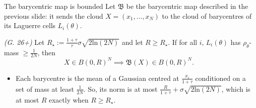 \documentclass[aspectratio=169]{beamer} %
\renewcommand{\ln}[1]{\mathrm{ln}\left(#1\right)}
\begin{document}
	\begin{frame}[t]{The barycentric map is bounded}
		Let $\mathfrak B$ be the barycentric map described in the previous slide: it sends the cloud $X=(x_1,\dots,x_N)$ to the cloud of barycentres of its Laguerre cells $L_i(\theta)$.
		\vspace{\baselineskip}
		\begin{mythm*}{\itshape (G. 26+)}
			Let $R_\star:=\frac{1+\tau}{\tau}\sigma\sqrt{2\ln{2N}}$ and let $R\geq R_\star$.
			If for all $i$, $L_i(\theta)$ has $\rho_\theta$-mass $\geq\frac{1}{2N}$, then
			\begin{equation*}
				X\in B(0,R)^N\implies\mathfrak B(X)\in B(0,R)^N.
			\end{equation*}
		\end{mythm*}
		\pause
		\vspace{\baselineskip}
		\begin{itemize}
			\item Each barycentre is the mean of a Gaussian centred at $\frac{x_i}{1+\tau}$ conditioned on a set of mass at least $\frac{1}{2N}$. So, its norm is at most $\frac{R}{1+\tau}+\sigma\sqrt{2\ln{2N}}$, which is at most $R$ exactly when $R\geq R_\star$.
		\end{itemize}

\end{frame}
\end{document}
